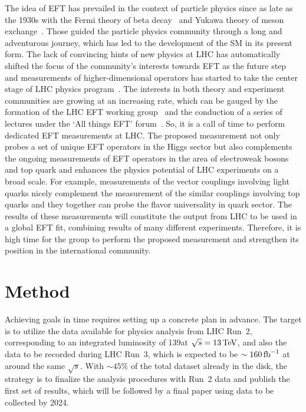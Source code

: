 \documentclass[a4paper,11pt]{article}
\begin{document}
The idea of EFT has prevailed in the context of particle physics since as late as the 1930s with the Fermi theory of beta decay~\cite{Fermi:1934hr} and Yukawa theory of meson exchange~\cite{Yukawa:1935xg}.
Those guided the particle physics community through a long and adventurous journey, 
which has led to the development of the SM in its present form. 
The lack of convincing hints of new physics at LHC has automatically shifted the focus of the community's interests towards EFT as the future step~\cite{Ellis:2018gqa,Ellis:2020unq,Ethier:2021bye} 
and measurements of higher-dimensional operators has started to take the center stage of LHC physics program~\cite{CMS:2021nnc,CMS:2021aly,CMS:2021gme}.
The interests in both theory and experiment communities are growing at an increasing rate, 
which can be gauged by the formation of the LHC EFT working group~\cite{LHC_EFT_WG} and the conduction of a series of lectures under the `All things EFT' forum~\cite{All_EFT}. 
So, it is a call of time to perform dedicated EFT measurements at LHC.
The proposed measurement not only probes a set of unique EFT operators in the Higgs sector but also complements the ongoing measurements of EFT operators in the area of electroweak bosons and top quark and enhances the physics potential of LHC experiments on a broad scale. 
For example, measurements of the vector couplings involving light quarks nicely complement the measurement of the similar couplings involving top quarks and they together can probe the flavor universality in quark sector.
The results of these measurements will constitute the output from LHC to be used in a global EFT fit, combining results of many different experiments.
Therefore, it is high time for the group to perform the proposed measurement and strengthen its position in the international community. 

\section{Method}
\label{sec:method}

Achieving goals in time requires setting up a concrete plan in advance. 
The target is to utilize the data available for physics analysis from LHC Run~2, corresponding to an integrated luminosity of 139\fbinv at $\sqrt{s}=13\,\text{Te\hspace{-.08em}V}$, and also the data to be recorded during LHC Run~3, which is expected to be $\sim 160\mbox{\ensuremath{\,\text{fb}^{-1}}}$ at around the same $\sqrt{s}$. 
With $\sim 45\%$ of the total dataset already in the disk, the strategy is to finalize the analysis procedures with Run~2 data and publish the first set of results, which will be followed by a final paper using data to be collected by 2024. 
\end{document}
